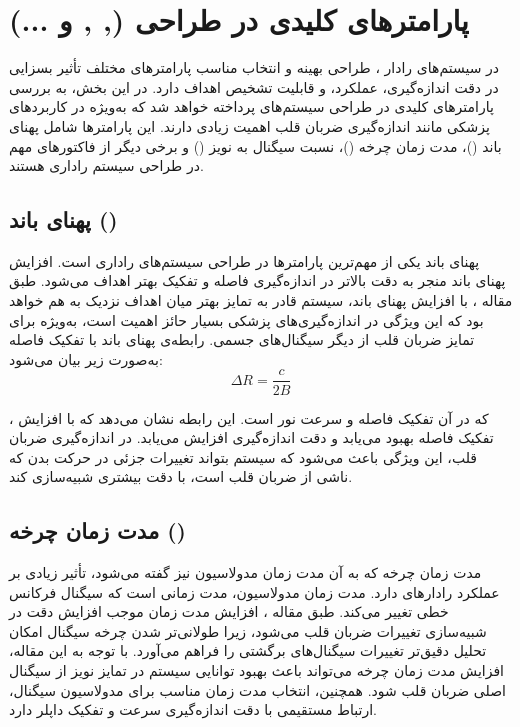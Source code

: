 \section{پارامترهای کلیدی در طراحی  (, ,  و ...)}\label{sec:fmcw-key-parameters} %


در سیستم‌های رادار ، طراحی بهینه و انتخاب مناسب پارامترهای مختلف تأثیر بسزایی در دقت اندازه‌گیری، عملکرد، و قابلیت تشخیص اهداف دارد. در این بخش، به بررسی پارامترهای کلیدی در طراحی سیستم‌های  پرداخته خواهد شد که به‌ویژه در کاربردهای پزشکی مانند اندازه‌گیری ضربان قلب اهمیت زیادی دارند. این پارامترها شامل پهنای باند ()، مدت زمان چرخه ()، نسبت سیگنال به نویز () و برخی دیگر از فاکتورهای مهم در طراحی سیستم راداری هستند.

\subsection{پهنای باند ()} %
\label{sec:bandwidth}

پهنای باند  یکی از مهم‌ترین پارامترها در طراحی سیستم‌های راداری  است. افزایش پهنای باند منجر به دقت بالاتر در اندازه‌گیری فاصله و تفکیک بهتر اهداف می‌شود. طبق مقاله \cite{islam2020non}، با افزایش پهنای باند، سیستم قادر به تمایز بهتر میان اهداف نزدیک به هم خواهد بود که این ویژگی در اندازه‌گیری‌های پزشکی بسیار حائز اهمیت است، به‌ویژه برای تمایز ضربان قلب از دیگر سیگنال‌های جسمی.
رابطه‌ی پهنای باند با تفکیک فاصله به‌صورت زیر بیان می‌شود:
\begin{equation}
\Delta R = \frac{c}{2B}
\label{eq:range_resolution_bandwidth}
\end{equation}

که در آن  تفکیک فاصله و  سرعت نور است. این رابطه نشان می‌دهد که با افزایش ، تفکیک فاصله بهبود می‌یابد و دقت اندازه‌گیری افزایش می‌یابد. در اندازه‌گیری ضربان قلب، این ویژگی باعث می‌شود که سیستم بتواند تغییرات جزئی در حرکت بدن که ناشی از ضربان قلب است، با دقت بیشتری شبیه‌سازی کند.

\subsection{مدت زمان چرخه ()} %
\label{sec:chirp-duration}

مدت زمان چرخه  که به آن مدت زمان مدولاسیون نیز گفته می‌شود، تأثیر زیادی بر عملکرد رادارهای  دارد. مدت زمان مدولاسیون، مدت زمانی است که سیگنال فرکانس خطی تغییر می‌کند. طبق مقاله \cite{lv2024millimeter}، افزایش مدت زمان  موجب افزایش دقت در شبیه‌سازی تغییرات ضربان قلب می‌شود، زیرا طولانی‌تر شدن چرخه سیگنال امکان تحلیل دقیق‌تر تغییرات سیگنال‌های برگشتی را فراهم می‌آورد.
با توجه به این مقاله، افزایش مدت زمان چرخه می‌تواند باعث بهبود توانایی سیستم در تمایز نویز از سیگنال اصلی ضربان قلب شود. همچنین، انتخاب مدت زمان مناسب برای مدولاسیون سیگنال، ارتباط مستقیمی با دقت اندازه‌گیری سرعت و تفکیک داپلر دارد.

